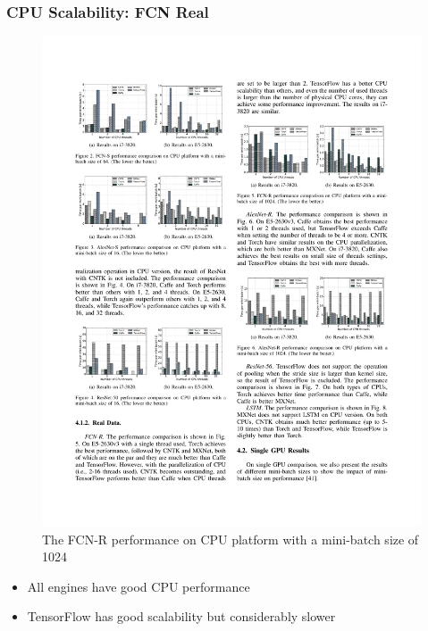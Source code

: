 \begin{frame}
	\MyLogo
	\frametitle{CPU Scalability: FCN Real}  
	\begin{figure}[htbp] 
		\includegraphics[width=\linewidth]{figures/FCN-R1.pdf} 
		\caption{The FCN-R performance on CPU platform with a mini-batch size of 1024}
	\end{figure}

\pause
	
\vskip -10pt
\begin{mdframed}[style=mystyle1]
\begin{itemize}
\item All engines have good CPU performance
\item TensorFlow has good scalability but considerably slower
\end{itemize}
\end{mdframed}

\end{frame}


